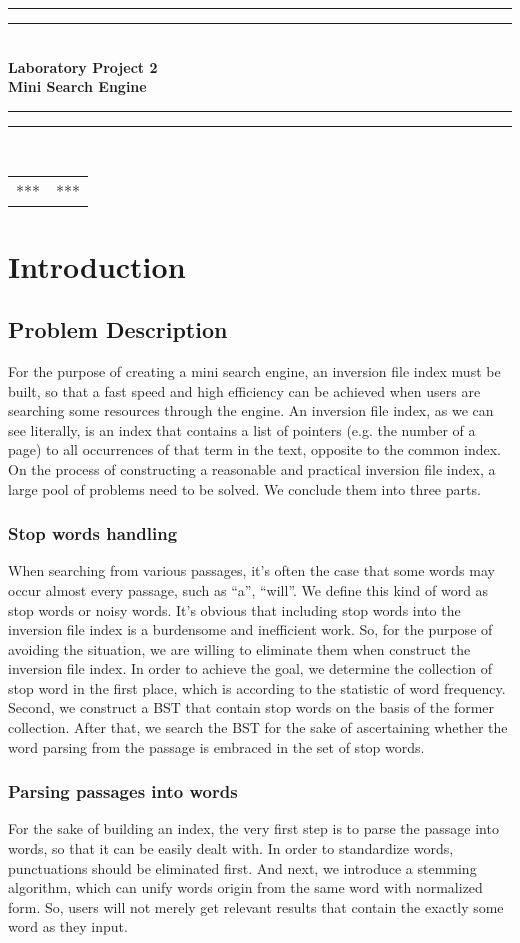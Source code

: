 \documentclass[12pt]{article}
\newcommand*{\mytitle}
{
	\begingroup 
		\centering
		\vspace*{0.2\paperheight} %
		\rule{\textwidth}{1.6pt}\vspace*{-\baselineskip}\vspace*{2pt} %
		\rule{\textwidth}{0.4pt}\\[\baselineskip] %
		{\LARGE{\sffamily\textbf {Laboratory Project 2 \\[0.3\baselineskip] Mini Search Engine}}}\\[0.2\baselineskip] %
		\rule{\textwidth}{0.4pt}\vspace*{-\baselineskip}\vspace{3.2pt} %
		\rule{\textwidth}{1.6pt}\\[\baselineskip] %
		\vspace*{\baselineskip} %
		\begin{center}
			\begin{tabular}{l l}
				***& ***
			\end{tabular}
		\end{center}		
		\centering{{\textbf{Date:}\hspace{2pt}{\textsf{ 2017-03-26}}}}
		\vfill
	\endgroup
}
\begin{document}
	\begin{titlepage}
		\mytitle
	\end{titlepage}	
	\begin{spacing}{1.2}
		\tableofcontents
	\end{spacing}
	\newpage
	\section{Introduction}
	\subsection{Problem Description}
For the purpose of creating a mini search engine, an inversion file index must be built, so that a fast speed and high efficiency can be achieved when users are searching some resources through the engine. An inversion file index, as we can see literally, is an index that contains a list of pointers (e.g. the number of a page) to all occurrences of that term in the text, opposite to the common index. On the process of constructing a reasonable and practical inversion file index, a large pool of problems need to be solved. We conclude them into three parts.
\subsubsection{Stop words handling}

 When searching from various passages, it’s often the case that some words may occur almost every passage, such as “a”, “will”. We define this kind of word as stop words or noisy words. It’s obvious that including stop words into the inversion file index is a burdensome and inefficient work. So, for the purpose of avoiding the situation, we are willing to eliminate them when construct the inversion file index. In order to achieve the goal, we determine the collection of stop word in the first place, which is according to the statistic of word frequency. Second, we construct a BST that contain stop words on the basis of the former collection. After that, we search the BST for the sake of ascertaining whether the word parsing from the passage is embraced in the set of stop words.
 
\subsubsection{Parsing passages into words}
For the sake of building an index, the very first step is to parse the passage into words, so that it can be easily dealt with. In order to standardize words, punctuations should be eliminated first. And next, we introduce a stemming algorithm, which can unify words origin from the same word with normalized form. So, users will not merely get relevant results that contain the exactly some word as they input. 
\end{document}
